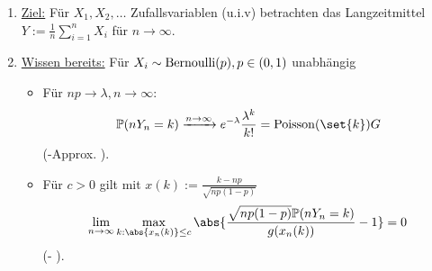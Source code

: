 \begin{enumerate}[label=]
	\item \ul{Ziel:} Für $X_1, X_2, \dots$ Zufallsvariablen (u.i.v) betrachten das Langzeitmittel $Y:= \frac{1}{n} \sum_{i=1}^n X_i$ für $n \to \infty$.
	\item  \ul{Wissen bereits:} Für $X_i \sim \operatorname{Bernoulli}(p), p \in (0,1)$ unabhängig
	\begin{itemize}
		\item Für $np \to \lambda, n \to \infty$:
		\begin{align*}
			\P(n Y_n = k) \xrightarrow{n \to \infty} e^{-\lambda}\frac{\lambda^k}{k!} = \Pois(\set{k}) 
G		\end{align*}
		(-Approx. ).
		\item Für $c > 0$ gilt mit $x(k) := \frac{k-np}{\sqrt{np(1-p)}}$
		\begin{align*}
			\lim_{n\to \infty} \max_{k: \abs{x_n(k)} \le c} \abs{\frac{\sqrt{np(1-p)}\P(nY_n = k)}{g(x_n(k))} -1} = 0
		\end{align*}
		(- ).
	\end{itemize}
\end{enumerate}
